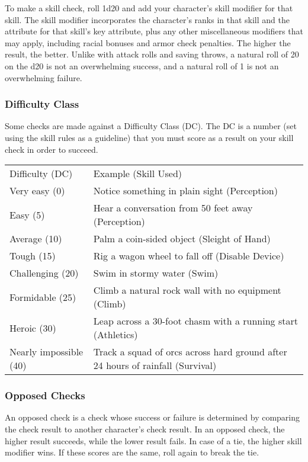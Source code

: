 To make a skill check, roll 1d20 and add your character's skill modifier for that skill. The skill modifier incorporates the character's ranks in that skill and the attribute for that skill's key attribute, plus any other miscellaneous modifiers that may apply, including racial bonuses and armor check penalties. The higher the result, the better. Unlike with attack rolls and saving throws, a natural roll of 20 on the d20 is not an overwhelming success, and a natural roll of 1 is not an overwhelming failure.

\subsubsection{Difficulty Class}
Some checks are made against a Difficulty Class (DC). The DC is a number (set using the skill rules as a guideline) that you must score as a result on your skill check in order to succeed.

\begin{dtable}
\begin{tabularx}{\columnwidth}{p{8em} X}
Difficulty (DC) & Example (Skill Used) \\
Very easy (0) & Notice something in plain sight (Perception) \\
Easy (5) & Hear a conversation from 50 feet away (Perception) \\
Average (10) & Palm a coin-sided object (Sleight of Hand) \\
Tough (15) & Rig a wagon wheel to fall off (Disable Device) \\
Challenging (20) & Swim in stormy water (Swim) \\
Formidable (25) & Climb a natural rock wall with no equipment (Climb) \\
Heroic (30) & Leap across a 30-foot chasm with a running start (Athletics) \\
Nearly impossible (40) & Track a squad of orcs across hard ground after 24 hours of rainfall (Survival) \\
\end{tabularx}
\end{dtable}

\subsubsection{Opposed Checks}
An opposed check is a check whose success or failure is determined by comparing the check result to another character's check result. In an opposed check, the higher result succeeds, while the lower result fails. In case of a tie, the higher skill modifier wins. If these scores are the same, roll again to break the tie.

